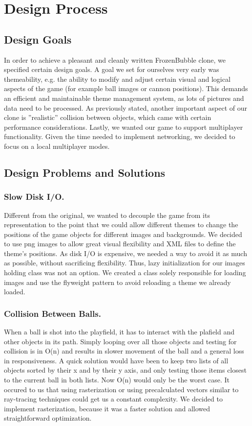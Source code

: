 \section{Design Process}
\subsection{Design Goals}
In order to achieve a pleasant and cleanly written FrozenBubble clone, we specified certain design goals.
A goal we set for ourselves very early was themeability, e.g. the ability to modify and 
adjust certain visual and logical aspects of the game (for example ball images or 
cannon positions). This demands an efficient and maintainable theme management 
system, as lots of pictures and data need to be processed.
As previously stated, another important aspect of our clone is ''realistic'' 
collision between objects, which came with certain performance considerations.
Lastly, we wanted our game to support multiplayer functionality. Given the time 
needed to implement networking, we decided to focus on a local multiplayer modes. 

\subsection{Design Problems and Solutions}
\subsubsection{Slow Disk I/O.}
\label{sec:theme}
%
Different from the original, we wanted to decouple the game from its representation 
to the point that we could allow different themes to change the positions of the 
game objects for different images and backgrounds. We decided to use png images to allow 
great visual flexibility and XML files to define the theme's positions. As disk I/O
is expensive, we needed a way to avoid it as much as possible, without sacrificing 
flexibility. Thus, lazy initialization for our images holding class was not an option. 
We created a class solely responsible for loading images and use the flyweight 
pattern to avoid reloading a theme we already loaded.
%
\subsubsection{Collision Between Balls.}
\label{sec:collision}
When a ball is shot into the playfield, it has to interact with the plafield 
and other objects in its path. Simply looping over all those objects and 
testing for collision is in O(n) and results in slower 
movement of the ball and a general loss in responsiveness. A quick solution 
would have been to keep two lists of all objects sorted by their x and by their 
y axis, and only testing those items closest to the current ball in both lists.
Now O(n) would only be the worst case. 
It occured to us that using rasterization or using precalculated vectors similar 
to ray-tracing techniques could get us a constant complexity. We decided 
to implement rasterization, because it was a faster solution and allowed straightforward
 optimization.
%
